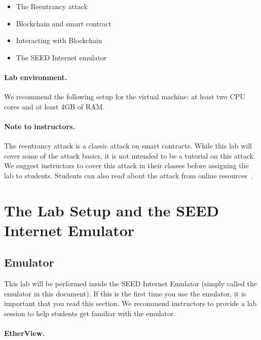 \begin{itemize}[noitemsep]
    \item The Reentrancy attack
    \item Blockchain and smart contract 
    \item Interacting with Blockchain
    \item The SEED Internet emulator
\end{itemize}

\paragraph{Lab environment.}
\seedenvironmentB
\nodependency
We recommend the following setup for the virtual machine: at least two CPU cores and 
at least 4GB of RAM.


\paragraph{Note to instructors.}
The reentrancy attack is a classic attack on smart contracts. 
While this lab will cover some of the attack basics,
it is not intended to be a tutorial on this attack.
We suggest instructors to cover this attack in their classes before 
assigning the lab to students. 
Students can also read about the attack from online 
resources~\cite{MasteringEthereum}.


\section{The Lab Setup and the SEED Internet Emulator}
\label{sec:labsetup}


\subsection{Emulator} 

This lab will be performed inside the SEED Internet Emulator (simply
called the emulator in this document). If this is the first time you
use the emulator, it is important that you read this section.
We recommend instructors to provide a lab session to
help students get familiar with the emulator.




\paragraph{EtherView.}



